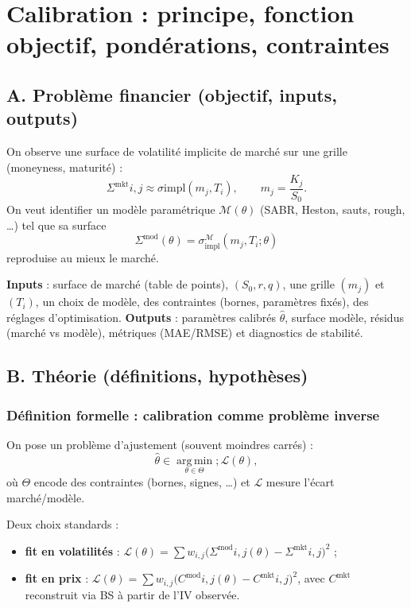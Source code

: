 \documentclass[11pt,a4paper]{report}
\theoremstyle{definition}
\theoremstyle{plain}
\theoremstyle{remark}
\newcommand{\1}{\mathbf{1}}
\newcommand{\argmin}{\operatorname*{arg\,min}}
\begin{document}
\chapter{Calibration : principe, fonction objectif, pondérations, contraintes}

\section{A. Problème financier (objectif, inputs, outputs)}
On observe une surface de volatilité implicite de marché sur une grille (moneyness, maturité) :
\[
\Sigma^{\text{mkt}}{i,j}\approx \sigma{\text{impl}}(m_j,T_i),\qquad m_j=\frac{K_j}{S_0}.
\]
On veut identifier un modèle paramétrique $\mathcal{M}(\theta)$ (SABR, Heston, sauts, rough, \ldots) tel que sa surface
\[
\Sigma^{\text{mod}}(\theta)=\sigma_{\text{impl}}^{\mathcal{M}}(m_j,T_i;\theta)
\]
reproduise au mieux le marché.

\textbf{Inputs} : surface de marché (table de points), $(S_0,r,q)$, une grille $(m_j)$ et $(T_i)$, un choix de modèle, des contraintes (bornes, paramètres fixés), des réglages d'optimisation.
\textbf{Outputs} : paramètres calibrés $\hat\theta$, surface modèle, résidus (marché vs modèle), métriques (MAE/RMSE) et diagnostics de stabilité.

\section{B. Théorie (définitions, hypothèses)}
\subsection*{Définition formelle : calibration comme problème inverse}
On pose un problème d'ajustement (souvent moindres carrés) :
\[
\hat\theta \in \argmin_{\theta\in\Theta}; \mathcal{L}(\theta),
\]
où $\Theta$ encode des contraintes (bornes, signes, \ldots) et $\mathcal{L}$ mesure l'écart marché/modèle.

Deux choix standards :
\begin{itemize}[leftmargin=*]
\item \textbf{fit en volatilités} : $\mathcal{L}(\theta)=\sum w_{i,j}\big(\Sigma^{\text{mod}}{i,j}(\theta)-\Sigma^{\text{mkt}}{i,j}\big)^2$ ;
\item \textbf{fit en prix} : $\mathcal{L}(\theta)=\sum w_{i,j}\big(C^{\text{mod}}{i,j}(\theta)-C^{\text{mkt}}{i,j}\big)^2$,
avec $C^{\text{mkt}}$ reconstruit via BS à partir de l'IV observée.
\end{itemize}
\end{document}
